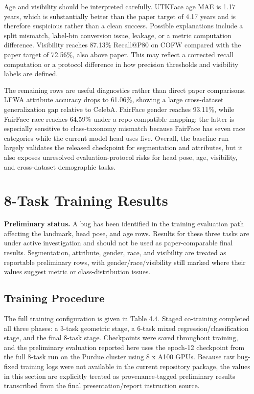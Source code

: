 \documentclass[11pt]{article}
\begin{document}
Age and visibility should be interpreted carefully. UTKFace age MAE is 1.17 years, which is substantially better than the paper target of 4.17 years and is therefore suspicious rather than a clean success. Possible explanations include a split mismatch, label-bin conversion issue, leakage, or a metric computation difference. Visibility reaches 87.13\% Recall@P80 on COFW compared with the paper target of 72.56\%, also above paper. This may reflect a corrected recall computation or a protocol difference in how precision thresholds and visibility labels are defined.


The remaining rows are useful diagnostics rather than direct paper comparisons. LFWA attribute accuracy drops to 61.06\%, showing a large cross-dataset generalization gap relative to CelebA. FairFace gender reaches 93.11\%, while FairFace race reaches 64.59\% under a repo-compatible mapping; the latter is especially sensitive to class-taxonomy mismatch because FairFace has seven race categories while the current model head uses five. Overall, the baseline run largely validates the released checkpoint for segmentation and attributes, but it also exposes unresolved evaluation-protocol risks for head pose, age, visibility, and cross-dataset demographic tasks.


\section{8-Task Training Results}


\textbf{Preliminary status.} A bug has been identified in the training evaluation path affecting the landmark, head pose, and age rows. Results for these three tasks are under active investigation and should not be used as paper-comparable final results. Segmentation, attribute, gender, race, and visibility are treated as reportable preliminary rows, with gender/race/visibility still marked where their values suggest metric or class-distribution issues.


\subsection{Training Procedure}


The full training configuration is given in Table 4.4. Staged co-training completed all three phases: a 3-task geometric stage, a 6-task mixed regression/classification stage, and the final 8-task stage. Checkpoints were saved throughout training, and the preliminary evaluation reported here uses the epoch-12 checkpoint from the full 8-task run on the Purdue cluster using 8 x A100 GPUs. Because raw bug-fixed training logs were not available in the current repository package, the values in this section are explicitly treated as provenance-tagged preliminary results transcribed from the final presentation/report instruction source.
\end{document}

